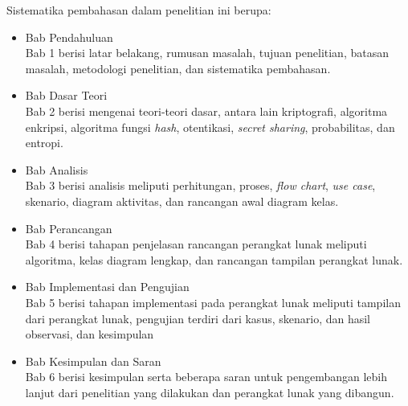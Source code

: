 Sistematika pembahasan dalam penelitian ini berupa:
\begin{itemize}
	\item Bab Pendahuluan
	\\Bab 1 berisi latar belakang, rumusan masalah, tujuan penelitian, batasan masalah, metodologi penelitian, dan sistematika pembahasan.
	\item Bab Dasar Teori
	\\Bab 2 berisi mengenai teori-teori dasar, antara lain kriptografi, algoritma enkripsi, algoritma fungsi \textit{hash}, otentikasi, \textit{secret sharing}, probabilitas, dan entropi.
	\item Bab Analisis
	\\Bab 3 berisi analisis meliputi perhitungan, proses, \textit{flow chart}, \textit{use case}, skenario, diagram aktivitas, dan rancangan awal diagram kelas.
	\item Bab Perancangan
	\\Bab 4 berisi tahapan penjelasan rancangan perangkat lunak meliputi algoritma, kelas diagram lengkap, dan rancangan tampilan perangkat lunak.
	\item Bab Implementasi dan Pengujian
	\\Bab 5 berisi tahapan implementasi pada perangkat lunak meliputi tampilan dari perangkat lunak, pengujian terdiri dari kasus, skenario, dan hasil observasi, dan kesimpulan
	\item Bab Kesimpulan dan Saran
	\\Bab 6 berisi kesimpulan serta beberapa saran untuk pengembangan lebih lanjut dari penelitian yang dilakukan dan perangkat lunak yang dibangun.
\end{itemize}